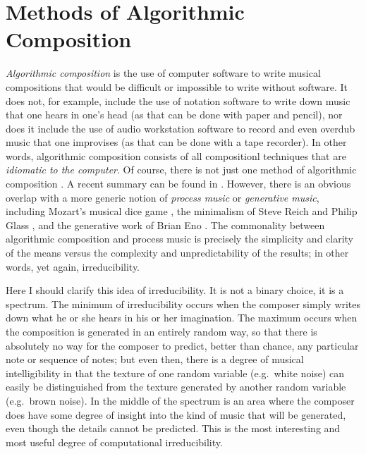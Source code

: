 \documentclass[11pt]{scrartcl}
\begin{document}
\section*{Methods of Algorithmic Composition}

\emph{Algorithmic composition} is the use of computer software to write musical compositions that would be difficult or impossible to write without software. It does not, for example, include the use of notation software to write down music that one hears in one's head (as that can be done with paper and pencil), nor does it include the use of audio workstation software to record and even overdub music that one improvises (as that can be done with a tape recorder). In other words, algorithmic composition consists of all compositionl techniques that are \emph{idiomatic to the computer}. Of course, there is not just one method of algorithmic composition \parencite{fernandez2013ai, arizanet}. A recent summary can be found in \parencite{mclean2018oxford}. However, there is an obvious overlap with a more generic notion of \emph{process music} or \emph{generative music}, including Mozart's musical dice game \parencite{humdrumdice}, the minimalism of Steve Reich \parencite{reichprocess, 10.2307/832600} and Philip Glass \parencite{potter2002four, glass2015words}, and the generative work of Brian Eno \parencite{eno1996generative}. The commonality between algorithmic composition and process music is precisely the simplicity and clarity of the means versus the complexity and unpredictability of the results; in other words, yet again, irreducibility. 

Here I should clarify this idea of irreducibility. It is not a binary choice, it is a spectrum. The minimum of irreducibility occurs when the composer simply writes down what he or she hears in his or her imagination. The maximum occurs when the composition is generated in an entirely random way, so that there is absolutely no way for the composer to predict, better than chance, any particular note or sequence of notes; but even then, there is a degree of musical intelligibility in that the texture of one random variable (e.g.\ white noise) can easily be distinguished from the texture generated by another random variable (e.g.\ brown noise). In the middle of the spectrum is an area where the composer does have some degree of insight into the kind of music that will be generated, even though the details cannot be predicted. This is the most interesting and most useful degree of computational irreducibility.
\end{document}
